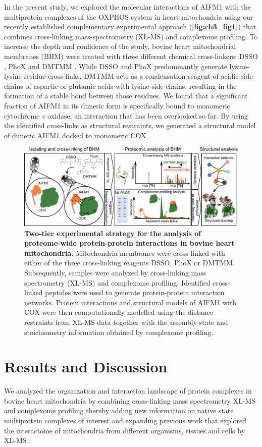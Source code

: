 In the present study, we explored the molecular interactions of AIFM1 with the multiprotein complexes of the OXPHOS system in heart mitochondria using our recently established complementary experimental approach (\textbf{\autoref{fig:ch3_fig1}}) \cite{RN11} that combines cross-linking mass-spectrometry (XL-MS) and complexome profiling. To increase the depth and confidence of the study, bovine heart mitochondrial membranes (BHM) were treated with three different chemical cross-linkers: DSSO \cite{RN12}, PhoX \cite{RN13} and DMTMM \cite{RN14}. While DSSO and PhoX predominantly generate lysine-lysine residue cross-links, DMTMM acts as a condensation reagent of acidic side chains of aspartic or glutamic acids with lysine side chains, resulting in the formation of a stable bond between those residues. We found that a significant fraction of AIFM1 in its dimeric form is specifically bound to monomeric cytochrome \emph{c} oxidase, an interaction that has been overlooked so far. By using the identified cross-links as structural restraints, we generated a structural model of dimeric AIFM1 docked to monomeric COX.
\begin{figure}[htb]
	\center
	\includegraphics[]{Chapter.3/Figures/Figure1.png}
	\caption{\textbf{Two-tier experimental strategy for the analysis of proteome-wide protein-protein interactions in bovine heart mitochondria.} Mitochondria membranes were cross-linked with either of the three cross-linking reagents DSSO, PhoX or DMTMM. Subsequently, samples were analyzed by cross-linking mass spectrometry (XL-MS) and complexome profiling. Identified cross-linked peptides were used to generate protein-protein interaction networks. Protein interactions and structural models of AIFM1 with COX were then computationally modelled using the distance restraints from XL-MS data together with the assembly state and stoichiometry information obtained by complexome profiling.}
	\label{fig:ch3_fig1}
\end{figure}
%
\section{Results and Discussion}
We analyzed the organization and interaction landscape of protein complexes in bovine heart mitochondria by combining cross-linking mass spectrometry XL-MS and complexome profiling \cite{RN15, RN11} thereby adding new information on native state multiprotein complexes of interest and expanding previous work that explored the interactome of mitochondria from different organisms, tissues and cells by XL-MS \cite{RN20, RN18, RN16, RN19, RN17}.
%
